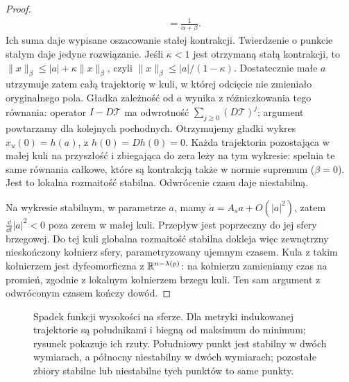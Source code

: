 \begin{proof}
\[\begin{aligned}
  &=\frac1{\alpha+\beta}.
 \end{aligned}
\]
Ich suma daje wypisane oszacowanie stałej kontrakcji.
Twierdzenie o punkcie stałym daje jedyne rozwiązanie.
Jeśli $\kappa<1$ jest otrzymaną stałą kontrakcji, to
$\|x\|_\beta\leq |a|+\kappa\|x\|_\beta$,
czyli $\|x\|_\beta\leq |a|/(1-\kappa)$.
Dostatecznie małe $a$ utrzymuje zatem całą trajektorię
w kuli, w której odcięcie nie zmieniało oryginalnego pola.
Gładka zależność od $a$ wynika z różniczkowania
tego równania: operator $I-D\mathcal T$ ma odwrotność
$\sum_{j\geq0}(D\mathcal T)^j$; argument powtarzamy
dla kolejnych pochodnych. Otrzymujemy gładki wykres
$x_u(0)=h(a)$, z $h(0)=Dh(0)=0$.
Każda trajektoria pozostająca w małej kuli na przyszłość
i zbiegająca do zera leży na tym wykresie:
spełnia te same równania całkowe, które są kontrakcją
także w normie supremum ($\beta=0$).
Jest to lokalna rozmaitość stabilna.
Odwrócenie czasu daje niestabilną.

Na wykresie stabilnym, w parametrze $a$, mamy
$\dot a=A_sa+O(|a|^2)$, zatem
$\frac{\dd}{\dd t}|a|^2<0$ poza zerem w małej kuli.
Przepływ jest poprzeczny do jej sfery brzegowej.
Do tej kuli globalna rozmaitość stabilna dokleja
więc zewnętrzny nieskończony kołnierz sfery,
parametryzowany ujemnym czasem. Kula z takim
kołnierzem jest dyfeomorficzna z $\mathbb{R}^{n-\lambda(p)}$:
na kołnierzu zamieniamy czas na promień,
zgodnie z lokalnym kołnierzem brzegu kuli.
Ten sam argument z odwróconym czasem kończy dowód.
\end{proof}

\begin{figure}[H]
\centering
{}
\caption{Spadek funkcji wysokości na sferze.
Dla metryki indukowanej trajektorie są południkami
i biegną od maksimum do minimum; rysunek pokazuje ich rzuty.
Południowy punkt jest stabilny w dwóch
wymiarach, a północny niestabilny w dwóch
wymiarach; pozostałe zbiory stabilne
lub niestabilne tych punktów to same punkty.}
\label{fig:przeplyw-morse-sfera-17}
\end{figure}

